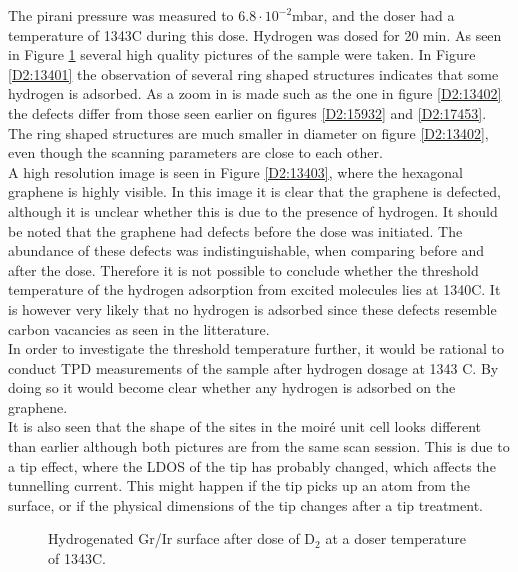The pirani pressure was measured to $6.8 \cdot 10^{-2}$mbar, and the doser had a temperature of 1343\degree C during this dose. Hydrogen was dosed for 20 min. As seen in Figure \ref{D2:1340} several high quality pictures of the sample were taken. In Figure \ref{D2:13401} the observation of several ring shaped structures indicates that some hydrogen is adsorbed. As a zoom in is made such as the one in figure \ref{D2:13402} the defects differ from those seen earlier on figures \ref{D2:15932} and \ref{D2:17453}. The ring shaped structures are much smaller in diameter on figure \ref{D2:13402}, even though the scanning parameters are close to each other.\\
A high resolution image is seen in Figure \ref{D2:13403}, where the hexagonal graphene is highly visible. In this image it is clear that the graphene is defected, although it is unclear whether this is due to the presence of hydrogen. It should be noted that the graphene had defects before the dose was initiated. The abundance of these defects was indistinguishable, when comparing before and after the dose. Therefore it is not possible to conclude whether the threshold temperature of the hydrogen adsorption from excited molecules lies at 1340\degree C. It is however very likely that no hydrogen is adsorbed since these defects resemble carbon vacancies as seen in the litterature.\cite{1367-2630-11-2-023006}\\
In order to investigate the threshold temperature further, it would be rational to conduct TPD measurements of the sample after hydrogen dosage at 1343 \degree C. By doing so it would become clear whether any hydrogen is adsorbed on the graphene. \\
 It is also seen that the shape of the sites in the moiré unit cell looks different than earlier although both pictures are from the same scan session. This is due to a tip effect, where the LDOS of the tip has probably changed, which affects the tunnelling current. This  might happen if the tip picks up an atom from the surface, or if the physical dimensions of the tip changes after a tip treatment.


\begin{figure}[H]
\caption{Hydrogenated Gr/Ir surface after dose of D$_2$ at a doser temperature of 1343\degree C.}
\label{D2:1340}
\end{figure}


